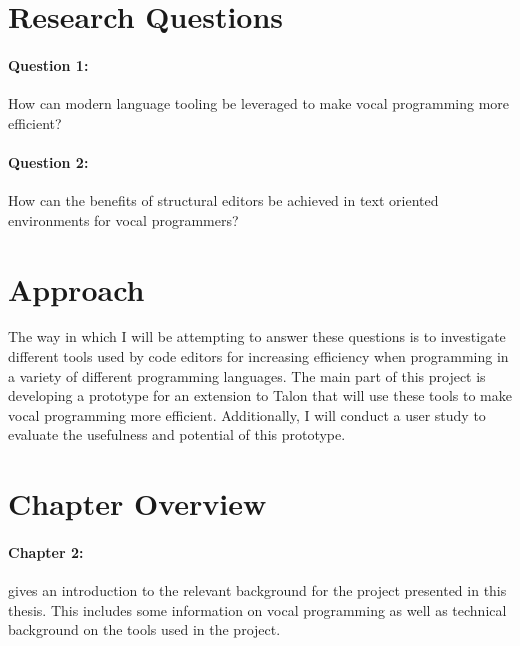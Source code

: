 \documentclass[../thesis.tex]{subfiles}
\begin{document}

\newpage
\section{Research Questions}
\paragraph{Question 1:}
How can modern language tooling be leveraged to make vocal programming more efficient?
\paragraph{Question 2:}
How can the benefits of structural editors be achieved in text oriented environments for vocal programmers?

\section{Approach}
The way in which I will be attempting to answer these questions is to
investigate different tools used by code editors for increasing efficiency
when programming in a variety of different programming languages.
The main part of this project is developing a prototype for an extension
to Talon that will use these tools to make vocal programming more efficient.
Additionally, I will conduct a user study to evaluate the usefulness and potential
of this prototype.

\section{Chapter Overview}
\paragraph{Chapter 2: } gives an introduction to the relevant background for the project presented in this thesis.
This includes some information on vocal programming as well as technical background on the tools used in the project.
\end{document}
